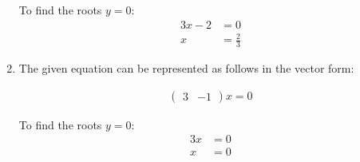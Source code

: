 \begin{enumerate}[label=\thesection.\arabic*.,ref=\thesection.\theenumi]
To find the roots $y=0$:
\begin{align}
3x - 2 &= 0 \\
x &= \frac{2}{3}
\end{align}

\item \solution 
\begin{flushleft}
The given equation can be represented as follows in the vector form:
\end{flushleft}
\begin{align}
\begin{pmatrix}
3 & -1 
\end{pmatrix}
x  = 0
\end{align}

To find the roots $y=0$:
\begin{align}
3x  &= 0 \\
x &= 0
\end{align}

\end{enumerate}







